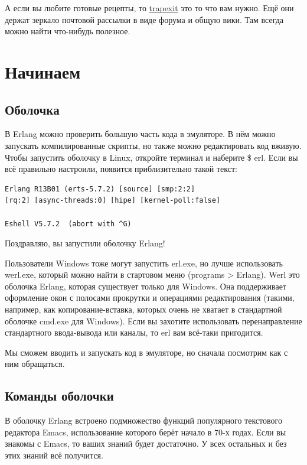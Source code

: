 \documentclass[a4paper,12pt]{report}
\newcommand{\ops}{\colorbox{lgreen}}
\begin{document}
А если вы любите готовые рецепты, то \href{http://trapexit.org}{trapexit} это то что вам нужно. Ещё они держат зеркало почтовой рассылки в виде форума и общую вики. Там всегда можно найти что\--нибудь полезное.

\chapter{Начинаем}
\section{Оболочка}
В Erlang можно проверить большую часть кода в эмуляторе. В нём можно запускать компилированные скрипты, но также можно редактировать код вживую. Чтобы запустить оболочку в Linux, откройте терминал и наберите \ops{\$ erl}. Если вы всё правильно настроили, появится приблизительно такой текст: 
\begin{lstlisting}[style=repl]
Erlang R13B01 (erts-5.7.2) [source] [smp:2:2] 
[rq:2] [async-threads:0] [hipe] [kernel-poll:false] 
 
Eshell V5.7.2  (abort with ^G) 
\end{lstlisting}

Поздравляю, вы запустили оболочку Erlang! 

Пользователи Windows тоже могут запустить \ops{erl.exe}, но лучше использовать \ops{werl.exe}, который можно найти в стартовом меню (\ops{programs > Erlang}). Werl это оболочка Erlang, которая существует только для Windows. Она поддерживает оформление окон с полосами прокрутки и операциями редактирования (такими, например, как копирование\--вставка, которых очень не хватает в стандартной оболочке \ops{cmd.exe} для Windows). Если вы захотите использовать перенаправление стандартного ввода\--вывода или каналы, то erl вам всё\--таки пригодится. 

Мы сможем вводить и запускать код в эмуляторе, но сначала посмотрим как с ним обращаться.
\section{Команды оболочки}
В оболочку Erlang встроено подмножество функций популярного текстового редактора Emacs, использование которого берёт начало в 70\--х годах. Если вы знакомы с Emacs, то ваших знаний будет достаточно. У всех остальных и без этих знаний всё получится.
\end{document}
